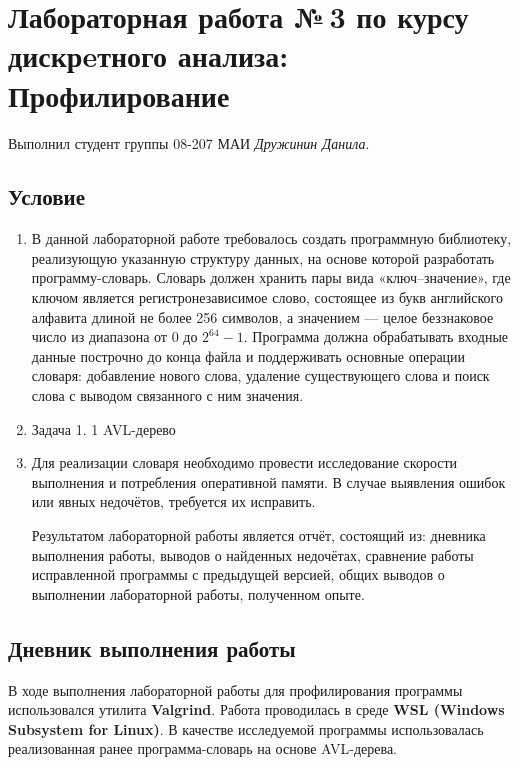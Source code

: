 \documentclass[12pt]{article}
\begin{document}
\section*{Лабораторная работа №\,3 по курсу дискрeтного анализа: Профилирование}

Выполнил студент группы 08-207 МАИ \textit{Дружинин Данила}.

\subsection*{Условие}

\begin{enumerate}
\item В данной лабораторной работе требовалось создать программную библиотеку, реализующую указанную структуру данных, на основе которой разработать программу-словарь. Словарь должен хранить пары вида «ключ--значение», где ключом является регистронезависимое слово, состоящее из букв английского алфавита длиной не более 256 символов, а значением --- целое беззнаковое число из диапазона от 0 до $2^{64} - 1$. Программа должна обрабатывать входные данные построчно до конца файла и поддерживать основные операции словаря: добавление нового слова, удаление существующего слова и поиск слова с выводом связанного с ним значения. 
\item Задача 1. 1 AVL-дерево
\item Для реализации словаря необходимо провести исследование скорости выполнения и потребления оперативной памяти. В случае выявления ошибок или явных недочётов, требуется их исправить.

Результатом лабораторной работы является отчёт, состоящий из:
дневника выполнения работы,
выводов о найденных недочётах,
сравнение работы исправленной программы с предыдущей версией,
общих выводов о выполнении лабораторной работы, полученном опыте.

\end{enumerate}

\subsection*{Дневник выполнения работы}

В ходе выполнения лабораторной работы для профилирования программы использовался утилита \textbf{Valgrind}. 
Работа проводилась в среде \textbf{WSL (Windows Subsystem for Linux)}. 
В качестве исследуемой программы использовалась реализованная ранее программа-словарь на основе AVL-дерева.
\end{document}
